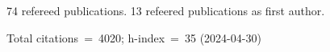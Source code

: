 74 refereed publications. 13 refeered publications as first author.

Total citations~=~4020; h-index~=~35 (2024-04-30)